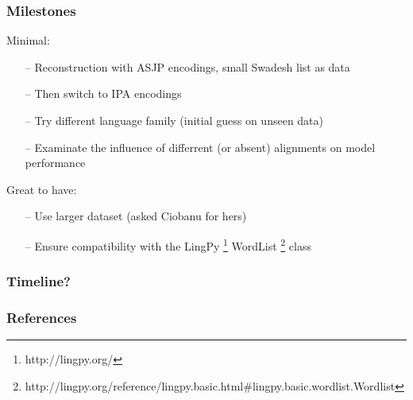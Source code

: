 \documentclass[10pt]{beamer}
\begin{document}
\begin{frame}
    \frametitle{Milestones}
    Minimal:
    \begin{itemize}
        \item[--] Reconstruction with ASJP encodings, small Swadesh list as data 
        \item[--] Then switch to IPA encodings
        \item[--] Try different language family (initial guess on unseen data)
        \item[--] Examinate the influence of differrent (or absent) alignments on model performance  
    \end{itemize}    
    Great to have:
    \begin{itemize}
        \item[--] Use larger dataset (asked Ciobanu for hers)
        \item[--] Ensure compatibility with the LingPy \footnote{http://lingpy.org/} WordList 
        \footnote{http://lingpy.org/reference/lingpy.basic.html\#lingpy.basic.wordlist.Wordlist} class
    \end{itemize}
\end{frame}

\begin{frame}
    \frametitle{Timeline?}
\end{frame}

\begin{frame}
    \frametitle{References}
    
\end{frame}
\end{document}
